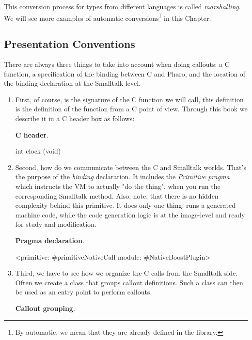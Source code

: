 \documentclass[a4paper,10pt,twoside]{book}
\begin{document}
This conversion process for types from different languages is called \emph{marshalling}. 
We will see more examples of automatic conversions\footnote{By automatic, we mean that they are already defined in the \NativeBoost library.} in this Chapter. 

\subsection{Presentation Conventions}

There are always three things to take into account when doing callouts:  a C function, a specification of the binding between C and Pharo, and the location of the binding declaration at the Smalltalk level. 

\begin{enumerate}

	\item First, of course, is the signature of the C function we will call, this definition is the definition of the function from a C point of view. Through this book we describe it in a C header box as follows:
	
\textbf{C header}. 
\begin{code}{}
int clock (void)
\end{code}


	\item Second, how do we communicate between the C and Smalltalk worlds. 
	That's the purpose of the \emph{binding} declaration.
	It includes the \emph{Primitive pragma} which instructs the VM to actually "do the thing", when you run the corresponding Smalltalk method. 
	Also, note, that there is no hidden complexity behind this primitive. 
	It does only one thing: runs a generated machine code, while the code generation logic is at the image-level and ready for study and modification.

\textbf{Pragma declaration}.	
\begin{code}{}
<primitive: #primitiveNativeCall module: #NativeBoostPlugin>
\end{code}

	\item Third, we have to see how we organize the C calls from the Smalltalk side. 
	Often we create a class that groups callout definitions. 
	Such a class can then be used as an entry point to perform callouts.

\textbf{Callout grouping}.


\end{enumerate}
\end{document}
